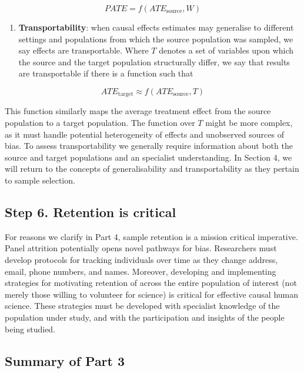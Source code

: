\documentclass[
  singlecolumn]{report}
\providecommand{\tightlist}{%
  \setlength{\itemsep}{0pt}\setlength{\parskip}{0pt}}\usepackage{longtable,booktabs,array}
\begin{document}
\[PATE =  f(ATE_{\text{source}}, W)\]

\begin{enumerate}
\def\labelenumi{\arabic{enumi}.}
\setcounter{enumi}{3}
\tightlist
\item
  \textbf{Transportability}: when causal effects estimates may
  generalise to different settings and populations from which the source
  population was sampled, we say effects are transportable. Where \(T\)
  denotes a set of variables upon which the source and the target
  population structurally differ, we say that results are transportable
  if there is a function such that
\end{enumerate}

\[ATE_{\text{target}} \approx f(ATE_{\text{source}}, T)\]

This function similarly maps the average treatment effect from the
source population to a target population. The function over \(T\) might
be more complex, as it must handle potential heterogeneity of effects
and unobserved sources of bias. To assess transportability we generally
require information about both the source and target populations and an
specialist understanding. In Section 4, we will return to the concepts
of generalisability and transportability as they pertain to sample
selection.

\hypertarget{step-6.-retention-is-critical}{%
\subsection{Step 6. Retention is
critical}\label{step-6.-retention-is-critical}}

For reasons we clarify in Part 4, sample retention is a mission critical
imperative. Panel attrition potentially opens novel pathways for bias.
Researchers must develop protocols for tracking individuals over time as
they change address, email, phone numbers, and names. Moreover,
developing and implementing strategies for motivating retention of
across the entire population of interest (not merely those willing to
volunteer for science) is critical for effective causal human science.
These strategies must be developed with specialist knowledge of the
population under study, and with the participation and insights of the
people being studied.

\hypertarget{summary-of-part-3}{%
\subsection{Summary of Part 3}\label{summary-of-part-3}}
\end{document}
